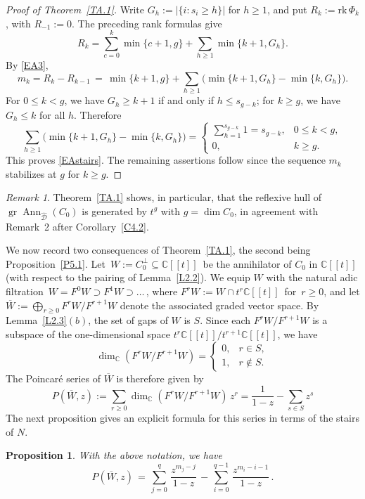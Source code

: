 \documentclass[11pt,reqno]{amsart}
\theoremstyle{plain}
\newtheorem{proposition}{Proposition}[section]
\theoremstyle{definition}
\theoremstyle{remark}
\newtheorem*{remark}{Remark}
\numberwithin{equation}{section}
\newcommand{\cD}{\mathcal{D}}
\newcommand{\C}{\mathbb{C}}
\newcommand{\hD}{\widehat{\cD}}
\DeclareMathOperator{\Ann}{Ann}
\DeclareMathOperator{\gr}{gr}
\begin{document}
\begin{proof}[Proof of Theorem~\ref{TA.1}]
Write $G_h:=|\{i:s_i\ge h\}|$ for $h\ge1$, and put $R_k:=\mathrm{rk}\,\Phi_k$, with
$R_{-1}:=0$. The preceding rank formulas give
\[
  R_k=\sum_{c=0}^{k}\min\{c+1,g\}+\sum_{h\ge1}\min\{k+1,G_h\}.
\]
By \eqref{EA3},
\[
  m_k =R_k-R_{k-1}\,=\,\min\{k+1,g\}
       +\sum_{h\ge1}\bigl(\min\{k+1,G_h\}-\min\{k,G_h\}\bigr).
\]
For $0\le k<g$, we have $G_h\ge k+1$ if and only if $h\le s_{g-k}$; for $k\ge g$, we have
$G_h\le k$ for all $h$. Therefore
\[
  \sum_{h\ge1}\bigl(\min\{k+1,G_h\}-\min\{k,G_h\}\bigr)
  =\begin{cases}
    \displaystyle\sum_{h=1}^{s_{g-k}}1=s_{g-k},&0\le k<g,\\[4pt]
    0,&k\ge g.
  \end{cases}
\]
This proves \eqref{EAstairs}. The remaining assertions follow since the sequence $m_k$ stabilizes at $g$ for $k\ge g$.
\end{proof}

\begin{remark}
Theorem~\ref{TA.1} shows, in particular, that the reflexive hull of $\gr \Ann_{\hD}(C_0)$ is
generated by $t^{g}$ with $g = \dim C_0$, in agreement with Remark~2 after
Corollary~\ref{C4.2}.
\end{remark}

We now record two consequences of Theorem~\ref{TA.1}, the second being Proposition~\ref{P5.1}.
Let $\,W := C_0^\perp \subseteq \C[[t]]\,$
be the annihilator of $ C_0 $ in $ \C[[t]]$ (with respect to the pairing of 
Lemma~\ref{L2.2}). We equip $W$ with the natural adic filtration $\,W = F^0W \supset F^1W \supset \ldots \,$, where $ F^rW := W \cap t^r\C[[t]]\,$ for $\,r \ge 0$, and let
$ \overline{W} := \bigoplus_{r\ge0} F^rW/F^{r+1}W$ denote the associated graded vector space. 
By Lemma~\ref{L2.3}$(b)$, the set of gaps of $W$ is $S$. Since each $F^rW/F^{r+1}W$ is a subspace
of the one-dimensional space $t^r\C[[t]]/t^{r+1}\C[[t]]$, we have
\[
  \dim_{\C}(F^rW/F^{r+1}W) = \begin{cases}
    0 , & r \in S , \\
    1 , & r \notin S .
  \end{cases}
\]
The Poincar\'e series of $\overline{W}$ is therefore given by
\begin{equation}
\label{EAPoincare}
  P(\overline{W},z) := \sum_{r\ge0}\dim_{\C}(F^rW/F^{r+1}W)\,z^r
  = \frac{1}{1-z}-\sum_{s\in S}z^s 
\end{equation}
The next proposition gives an explicit formula for this series in terms of the stairs of $N$.

\begin{proposition}
\label{PA.1}
With the above notation, we have
\begin{equation}
\label{EA8}
  P(\overline{W},z) \,= \,
    \sum_{j=0}^{q}\,\frac{z^{m_j-j}}{1-z}\,-\,\sum_{i=0}^{q-1}\,\frac{z^{m_i-i-1}}{1-z}\,.
\end{equation}
\end{proposition}
\end{document}
